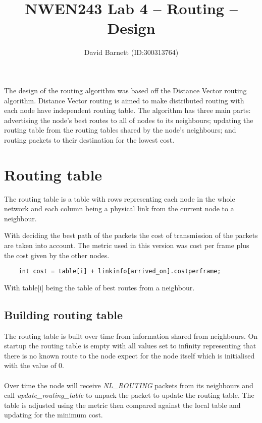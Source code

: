 \documentclass[12pt]{article}
\author{David Barnett (ID:300313764)}
\title{NWEN243 Lab 4 -- Routing -- Design}
\date{}
\begin{document}
\maketitle

The design of the routing algorithm was based off the Distance Vector routing
algorithm. Distance Vector routing is aimed to make distributed routing with
each node have independent routing table.
The algorithm has three main parts: advertising the node's best routes to all
of nodes to its neighbours; updating  the routing table from the routing
tables shared by the node's neighbours; and routing packets to their
destination for the lowest cost.

\section*{Routing table}

The routing table is a table with rows representing each node in the whole
network and each column being a physical link from the current node to a
neighbour.

With deciding the best path of the packets the cost of transmission of the
packets are taken into account. The metric used in this version was cost
per frame plus the cost given by the other nodes.

\begin{verbatim}
    int cost = table[i] + linkinfo[arrived_on].costperframe;
\end{verbatim}

With table[i] being the table of best routes from a neighbour.

\subsection*{Building routing table}

The routing table is built over time from information shared from neighbours.
On startup the routing table is empty with all values set to infinity
representing that there is no known route to the node expect for the node
itself which is initialised with the value of 0.

\paragraph{}

Over time the node will receive \emph{NL\_ROUTING} packets from its neighbours
and call \emph{update\_routing\_table} to unpack the packet to update the routing
table. The table is adjusted using the metric then compared against the local
table and updating for the minimum cost.
\end{document}
